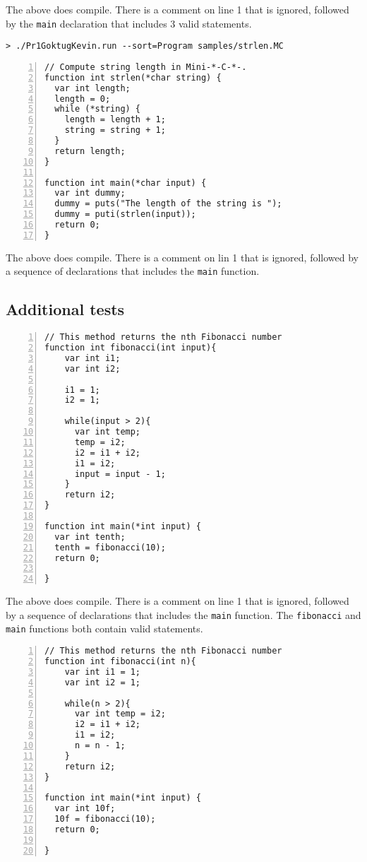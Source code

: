 \documentclass{article}
\begin{document}
The above does compile. There is a comment on line 1 that is ignored, followed by the \verb|main| declaration that includes 3 valid statements. 

\begin{verbatim}
> ./Pr1GoktugKevin.run --sort=Program samples/strlen.MC
\end{verbatim}
\begin{Verbatim}[numbers=left,xleftmargin=5mm]
// Compute string length in Mini-*-C-*-.
function int strlen(*char string) {
  var int length;
  length = 0;
  while (*string) {
    length = length + 1;
    string = string + 1;
  }
  return length;
}

function int main(*char input) {
  var int dummy;
  dummy = puts("The length of the string is ");
  dummy = puti(strlen(input));
  return 0;
}
\end{Verbatim}

The above does compile. There is a comment on lin 1 that is ignored, followed by a sequence of declarations that includes the \verb|main| function.

\subsection{Additional tests}

\begin{Verbatim}[numbers=left,xleftmargin=5mm]
// This method returns the nth Fibonacci number
function int fibonacci(int input){
    var int i1;
    var int i2;
    
    i1 = 1;
    i2 = 1;

    while(input > 2){
      var int temp;
      temp = i2;
      i2 = i1 + i2;
      i1 = i2;
      input = input - 1;
    }
    return i2;
}

function int main(*int input) {
  var int tenth;
  tenth = fibonacci(10);
  return 0;

}
\end{Verbatim}

The above does compile. There is a comment on line 1 that is ignored, followed by a sequence of declarations that includes the \verb|main| function. The \verb|fibonacci| and \verb|main| functions both contain valid statements.

\begin{Verbatim}[numbers=left,xleftmargin=5mm]
// This method returns the nth Fibonacci number
function int fibonacci(int n){
    var int i1 = 1;
    var int i2 = 1;

    while(n > 2){
      var int temp = i2;
      i2 = i1 + i2;
      i1 = i2;
      n = n - 1;
    }
    return i2;
}

function int main(*int input) {
  var int 10f;
  10f = fibonacci(10);
  return 0;

}
\end{Verbatim}
\end{document}
